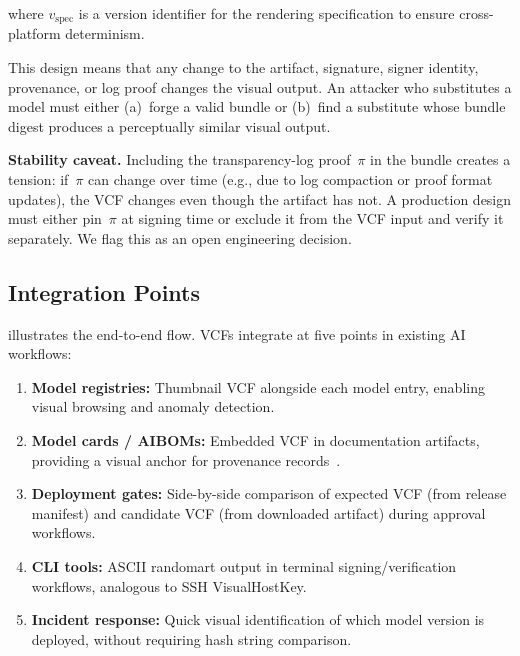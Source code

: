\documentclass[conference,10pt]{IEEEtran}
\begin{document}
\noindent where $v_{\text{spec}}$ is a version identifier for the rendering specification to ensure cross-platform determinism.

This design means that any change to the artifact, signature, signer identity, provenance, or log proof changes the visual output.
An attacker who substitutes a model must either (a)~forge a valid bundle or (b)~find a substitute whose bundle digest produces a perceptually similar visual output.

\smallskip\noindent\textbf{Stability caveat.}
Including the transparency-log proof~$\pi$ in the bundle creates a tension: if~$\pi$ can change over time (e.g., due to log compaction or proof format updates), the VCF changes even though the artifact has not.
A production design must either pin~$\pi$ at signing time or exclude it from the VCF input and verify it separately.
We flag this as an open engineering decision.

\subsection{Integration Points}

 illustrates the end-to-end flow.
VCFs integrate at five points in existing AI workflows:

\begin{enumerate}[leftmargin=*,nosep]
  \item \textbf{Model registries:} Thumbnail VCF alongside each model entry, enabling visual browsing and anomaly detection.
  \item \textbf{Model cards / AIBOMs:} Embedded VCF in documentation artifacts, providing a visual anchor for provenance records~\cite{aibom2026frontiers}.
  \item \textbf{Deployment gates:} Side-by-side comparison of expected VCF (from release manifest) and candidate VCF (from downloaded artifact) during approval workflows.
  \item \textbf{CLI tools:} ASCII randomart output in terminal signing/verification workflows, analogous to SSH VisualHostKey.
  \item \textbf{Incident response:} Quick visual identification of which model version is deployed, without requiring hash string comparison.
\end{enumerate}
\end{document}

